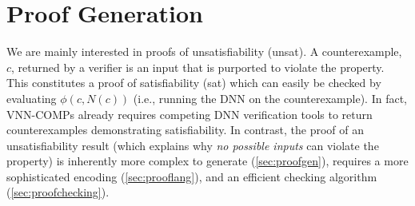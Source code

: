 \documentclass[oneside,11pt,dvipsnames]{book}
\begin{document}
\section{Proof Generation}\label{sec:proofgen}


We are mainly interested in proofs of unsatisfiability (unsat). A counterexample, $c$, returned by a verifier is an input that is purported to violate the property. This constitutes a proof of satisfiability (sat) which can easily be checked by evaluating $\phi(c,N(c))$ (i.e., running the DNN on the counterexample). 
In fact, VNN-COMPs already requires competing DNN verification tools to return counterexamples demonstrating satisfiability.  In contrast, the proof of an unsatisfiability result (which explains why \emph{no possible inputs} can violate the property) is inherently more complex to generate (\autoref{sec:proofgen}), requires a more sophisticated encoding (\autoref{sec:prooflang}), and an efficient checking algorithm (\autoref{sec:proofchecking}).
\end{document}
